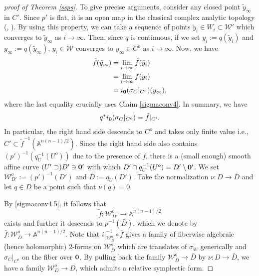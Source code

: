 \documentclass[12pt,a4paper]{amsart}
\theoremstyle{remark}
\theoremstyle{definition}
\def\A{\mathbb{A}}
\begin{document}
\begin{proof}[proof of Theorem \ref{ssps}]
To give precise 
arguments, consider any 
closed point 
$\tilde{y}_\infty$ in $C'$. Since $p'$ is flat, it is an open map in the classical complex analytic topology (\cite[Theorem 2.12]{B-S}, \cite[p73. Corollary]{Douady}). By using this property, we can take a sequence of 
points $\tilde{y}_i\in W_i\subset \mathcal{W}'$ which 
converges to $\tilde{y}_\infty$ as $i\to \infty$. 
Then, since $q$ is continuous, 
if we set $y_i:=q(\tilde{y}_i)$ and 
$y_\infty:=q(\tilde{y}_\infty)$, 
$y_i\in \mathcal{W}$ converges to $y_\infty\in C^o$ as 
$i\to \infty$. Now, we have 
\begin{align}
\tilde{f}(\tilde{y}_\infty)
&=\lim_{i\to \infty}\tilde{f}(\tilde{y}_i)\\
&=\lim_{i\to \infty}f(y_i)\\ 
&=i_{\bf 0}(\sigma_C|_{C^o})(y_\infty), 
\end{align}
where the last equality crucially uses 
Claim \ref{sigmaconv4}. In summary, we have 
\begin{align}\label{sigmaconv4.5}
q^* i_{\bf 0}(\sigma_C|_{C^o})=\tilde{f}|_{C'}. 
\end{align}
In particular, the right hand side descends to 
$C^o$ and takes only finite value i.e., 
$C'\subset \tilde{f}^{-1}(\A^{n(n-1)/2})$. 
Since the right hand side also contains 
$(p')^{-1}(q_U^{-1}(U^o))$ due to the presence of $f$, 
there is a (small enough) smooth affine curve 
$(U'\supset) D'\ni {\bf 0}'$ with which $D'\cap q_U^{-1}
(U^o)=D'\setminus {\bf 0}'$. 
We set $\mathcal{W}^o_{D'}:=(p')^{-1}(D')$ 
and $\bar{D}:=q_U(D')$. Take the normalization 
$\nu: D \to \bar{D}$ and let $q \in D$ be a point 
such that $\nu(q) = 0$.

By \eqref{sigmaconv4.5}, it follows that 
$$\tilde{f}\colon \mathcal{W}^o_{D'}\to \A^{n(n-1)/2}$$ 
exists and further it descends to 
$p^{-1}(\bar{D})$, which we denote by 
$\bar{f}: \mathcal{W}^o_{\bar D} \to \A^{n(n-1)/2}$.  
Note that $i|_{\mathcal{W}^o_{\bar D}}^{-1}\circ \overline{f}$ 
gives a family of fiberwise algebraic (hence holomorphic) 
$2$-forms on $\mathcal{W}^o_{\bar D}$ which 
are translates of $\sigma_W$ generically and 
$\sigma_C|_{C^o}$ on the fiber over ${\bf 0}$.
By pulling back the family $\mathcal{W}^o_{\bar D} \to \bar{D}$ by $\nu: D \to \bar{D}$, we have a family 
$\mathcal{W}^o_D \to D$, which admits a relative symplectic form. 


\end{proof}
\end{document}
